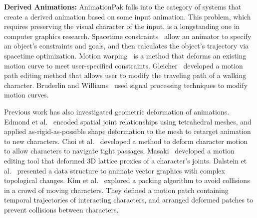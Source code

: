 
\textbf{Derived Animations:} 
AnimationPak falls into the category of systems that create a derived
animation based on some input animation. This problem, which
requires preserving the visual character of the input, is a 
longstanding one in computer graphics research.
Spacetime constraints~\cite{Witkin1988, Cohen1992} allow an animator
to specify an object's constraints and goals, and then calculates 
the object's trajectory via spacetime optimization.
Motion warping~\cite{Witkin1995} is a method that deforms an existing
motion curve to meet user-specified constraints.
Gleicher~\cite{Gleicher2001} developed a motion path editing method
that allows user to modify the traveling path of a walking character.
Bruderlin and Williams~\cite{Bruderlin1995} used signal processing techniques
to modify motion curves.


Previous work has also investigated geometric deformation of 
animations.
Edmond et al.~\cite{Ho2010} encoded spatial joint relationships 
using tetrahedral meshes, and applied as-rigid-as-possible shape deformation
to the mesh to retarget animation to new characters.
Choi et al.~\cite{Choi2011} developed a method to deform character motion
to allow characters to navigate tight passages.
Masaki~\cite{Oshita2017} developed a motion editing tool that deformed
3D lattice proxies of  a character's joints.
Dalstein et al.~\cite{Dalstein2015} presented a data structure
to animate vector graphics with complex topological changes.
Kim et al.~\cite{Kim2012} explored a packing algorithm
to avoid collisions in a crowd of moving characters.
They defined a motion patch containing temporal trajectories of interacting
characters, and arranged deformed patches to prevent collisions between
characters.




